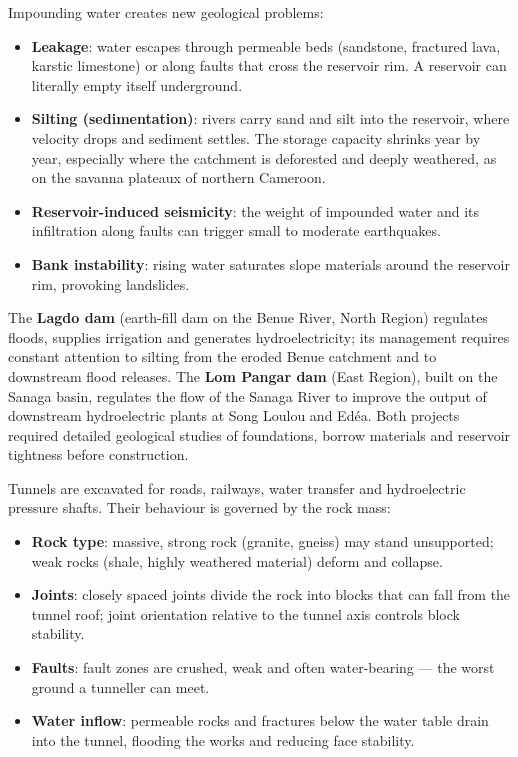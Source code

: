 \documentclass[11pt]{article}
\newcounter{popsec}
\newcounter{popsub}
\newcommand{\courssub}[1]{%
  \stepcounter{popsub}%
  \par\vspace{9pt}\noindent{\popxbold\fontsize{11.5}{13}\selectfont\color{popink}{\color{poporange}\thepopsec.\thepopsub}\hspace{6pt}#1}\par\nopagebreak\vspace{4pt}
}
\begin{document}
\courssub{Reservoir Problems}

Impounding water creates new geological problems:

\begin{itemize}
\item \textbf{Leakage}: water escapes through permeable beds (sandstone, fractured lava, karstic limestone) or along faults that cross the reservoir rim. A reservoir can literally empty itself underground.
\item \textbf{Silting (sedimentation)}: rivers carry sand and silt into the reservoir, where velocity drops and sediment settles. The storage capacity shrinks year by year, especially where the catchment is deforested and deeply weathered, as on the savanna plateaux of northern Cameroon.
\item \textbf{Reservoir-induced seismicity}: the weight of impounded water and its infiltration along faults can trigger small to moderate earthquakes.
\item \textbf{Bank instability}: rising water saturates slope materials around the reservoir rim, provoking landslides.
\end{itemize}

\begin{savaistu}
The \textbf{Lagdo dam} (earth-fill dam on the Benue River, North Region) regulates floods, supplies irrigation and generates hydroelectricity; its management requires constant attention to silting from the eroded Benue catchment and to downstream flood releases. The \textbf{Lom Pangar dam} (East Region), built on the Sanaga basin, regulates the flow of the Sanaga River to improve the output of downstream hydroelectric plants at Song Loulou and Ed\'ea. Both projects required detailed geological studies of foundations, borrow materials and reservoir tightness before construction.
\end{savaistu}

\courssub{Tunnels}

Tunnels are excavated for roads, railways, water transfer and hydroelectric pressure shafts. Their behaviour is governed by the rock mass:

\begin{itemize}
\item \textbf{Rock type}: massive, strong rock (granite, gneiss) may stand unsupported; weak rocks (shale, highly weathered material) deform and collapse.
\item \textbf{Joints}: closely spaced joints divide the rock into blocks that can fall from the tunnel roof; joint orientation relative to the tunnel axis controls block stability.
\item \textbf{Faults}: fault zones are crushed, weak and often water-bearing --- the worst ground a tunneller can meet.
\item \textbf{Water inflow}: permeable rocks and fractures below the water table drain into the tunnel, flooding the works and reducing face stability.
\end{itemize}
\end{document}
